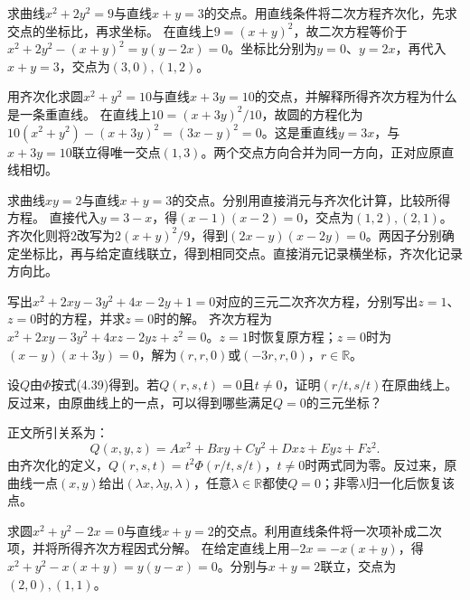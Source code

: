 求曲线\(x^2+2y^2=9\)与直线\(x+y=3\)的交点。用直线条件将二次方程齐次化，先求交点的坐标比，再求坐标。
\solutionanswer
在直线上\(9=(x+y)^2\)，故二次方程等价于\(x^2+2y^2-(x+y)^2=y(y-2x)=0\)。坐标比分别为\(y=0\)、\(y=2x\)，再代入\(x+y=3\)，交点为\((3,0),(1,2)\)。


用齐次化求圆\(x^2+y^2=10\)与直线\(x+3y=10\)的交点，并解释所得齐次方程为什么是一条重直线。
\solutionanswer
在直线上\(10=(x+3y)^2/10\)，故圆的方程化为\(10(x^2+y^2)-(x+3y)^2=(3x-y)^2=0\)。这是重直线\(y=3x\)，与\(x+3y=10\)联立得唯一交点\((1,3)\)。两个交点方向合并为同一方向，正对应原直线相切。


求曲线\(xy=2\)与直线\(x+y=3\)的交点。分别用直接消元与齐次化计算，比较所得方程。
\solutionanswer
直接代入\(y=3-x\)，得\((x-1)(x-2)=0\)，交点为\((1,2),(2,1)\)。齐次化则将\(2\)改写为\(2(x+y)^2/9\)，得到\((2x-y)(x-2y)=0\)。两因子分别确定坐标比，再与给定直线联立，得到相同交点。直接消元记录横坐标，齐次化记录方向比。


写出\(x^2+2xy-3y^2+4x-2y+1=0\)对应的三元二次齐次方程，分别写出\(z=1\)、\(z=0\)时的方程，并求\(z=0\)时的解。
\solutionanswer
齐次方程为\(x^2+2xy-3y^2+4xz-2yz+z^2=0\)。\(z=1\)时恢复原方程；\(z=0\)时为\((x-y)(x+3y)=0\)，解为\((r,r,0)\)或\((-3r,r,0)\)，\(r\in\mathbb R\)。


设\(Q\)由\(\Phi\)按式\textup{(4.39)}得到。若\(Q(r,s,t)=0\)且\(t\ne0\)，证明\((r/t,s/t)\)在原曲线上。反过来，由原曲线上的一点，可以得到哪些满足\(Q=0\)的三元坐标？

\par\smallskip\noindent 正文所引关系为：
\begin{equation*}
Q(x,y,z)=Ax^2+Bxy+Cy^2+Dxz+Eyz+Fz^2 .
\end{equation*}
\solutionanswer
由齐次化的定义，\(Q(r,s,t)=t^2\Phi(r/t,s/t)\)，\(t\ne0\)时两式同为零。反过来，原曲线一点\((x,y)\)给出\((\lambda x,\lambda y,\lambda)\)，任意\(\lambda\in\mathbb R\)都使\(Q=0\)；非零\(\lambda\)归一化后恢复该点。


求圆\(x^2+y^2-2x=0\)与直线\(x+y=2\)的交点。利用直线条件将一次项补成二次项，并将所得齐次方程因式分解。
\solutionanswer
在给定直线上用\(-2x=-x(x+y)\)，得\(x^2+y^2-x(x+y)=y(y-x)=0\)。分别与\(x+y=2\)联立，交点为\((2,0),(1,1)\)。


